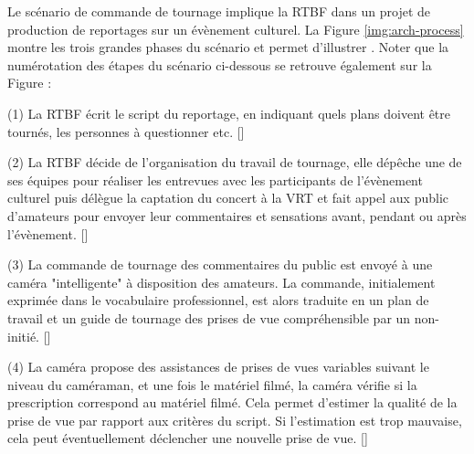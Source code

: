 Le scénario de commande de tournage implique la RTBF dans un projet de production de reportages sur un évènement culturel.
La Figure \ref{img:arch-process} montre les trois grandes phases du scénario et permet d'illustrer . 
Noter que la numérotation des étapes du scénario ci-dessous se retrouve également sur la Figure :
\begin{listenum}
	\item[(1)] La RTBF écrit le script du reportage, en indiquant quels plans doivent être tournés, les personnes à questionner etc. [] 
	
	\item[(2)] La RTBF décide de l'organisation du travail de tournage, elle dépêche une de ses équipes pour réaliser les entrevues avec les participants de l'évènement culturel puis délègue la captation du concert à la VRT et fait appel aux public d'amateurs pour envoyer leur commentaires et sensations avant, pendant ou après l'évènement. [] 

	\item[(3)] La commande de tournage des commentaires du public est envoyé à une caméra "intelligente" à disposition des amateurs. La commande, initialement exprimée dans le vocabulaire professionnel, est alors traduite en un plan de travail et un guide de tournage des prises de vue compréhensible par un non-initié. []
	
	\item[(4)] La caméra propose des assistances de prises de vues variables suivant le niveau du caméraman, et une fois le matériel filmé, la caméra vérifie si la prescription correspond au matériel filmé. Cela permet d'estimer la qualité de la prise de vue par rapport aux critères du script. Si l'estimation est trop mauvaise, cela peut éventuellement déclencher une nouvelle prise de vue. []
	

\end{listenum}
